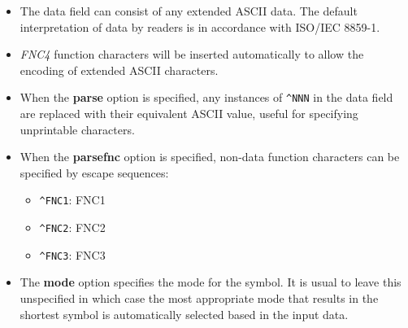 \begin{itemize}
\tightlist
\item
  The data field can consist of any extended ASCII data. The default
  interpretation of data by readers is in accordance with ISO/IEC
  8859-1.
\item
  \emph{FNC4} function characters will be inserted automatically to
  allow the encoding of extended ASCII characters.
\item
  When the \textbf{parse} option is specified, any instances of
  \texttt{\^{}NNN} in the data field are replaced with their equivalent
  ASCII value, useful for specifying unprintable characters.
\item
  When the \textbf{parsefnc} option is specified, non-data function
  characters can be specified by escape sequences:

  \begin{itemize}
  \tightlist
  \item
    \texttt{\^{}FNC1}: FNC1
  \item
    \texttt{\^{}FNC2}: FNC2
  \item
    \texttt{\^{}FNC3}: FNC3
  \end{itemize}
\item
  The \textbf{mode} option specifies the mode for the symbol. It is
  usual to leave this unspecified in which case the most appropriate
  mode that results in the shortest symbol is automatically selected
  based in the input data.


\end{itemize}
